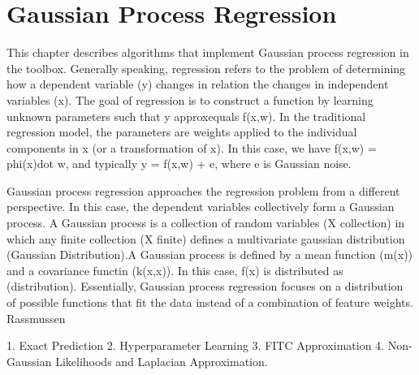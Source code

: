 \chapter{Gaussian Process Regression}

This chapter describes algorithms that implement Gaussian process regression
in the \shogun{} toolbox. Generally speaking, regression refers to the problem
of determining how a dependent variable (y) changes in relation the changes in 
independent variables (x). The goal of regression is to construct a function by
learning unknown parameters \w such that y approxequals f(x,w). In the traditional
regression model, the parameters \w are weights applied to the individual components
in x (or a transformation of x).  In this case, we have f(x,w) = phi(x)dot w, and
typically y = f(x,w) + e, where e is Gaussian noise. 

Gaussian process regression approaches the regression problem from a different perspective.
In this case, the dependent variables collectively form a Gaussian process. A Gaussian process
is a collection of random variables (X collection) in which any finite collection (X finite) 
defines a multivariate gaussian distribution (Gaussian Distribution).A Gaussian process is defined
by a mean function (m(x)) and a covariance functin (k(x,x)). In this case, f(x) is distributed as
(distribution). Essentially, Gaussian process regression focuses on a distribution of possible functions
that fit the data instead of a combination of feature weights. Rassmussen 

1. Exact Prediction
2. Hyperparameter Learning
3. FITC Approximation
4. Non-Gaussian Likelihoods and Laplacian Approximation.